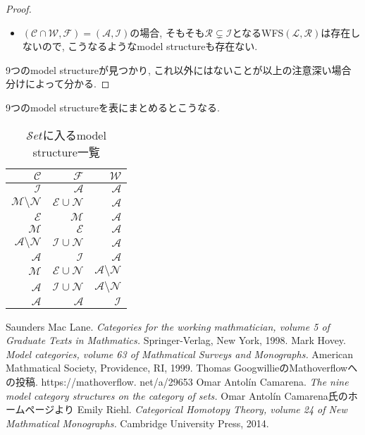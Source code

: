 \documentclass[. /main]{subfiles}
\begin{document}
\begin{proof}
\begin{itemize}
\item $(\mathcal{C} \cap \mathcal{W},  \mathcal{F})=(\mathcal{A},  \mathcal{I})$の場合, そもそも$\mathcal{R} \subsetneq \mathcal{I}$となるWFS$(\mathcal{L},  \mathcal{R})$は存在しないので, こうなるようなmodel structureも存在ない. 
\end{itemize}
9つのmodel structureが見つかり, これ以外にはないことが以上の注意深い場合分けによって分かる. 
\end{proof}
9つのmodel structureを表にまとめるとこうなる. 
\begin{table}[hbtp]
\caption{$\mathcal{S}et$に入るmodel structure一覧}
\centering
\begin{tabular}{rrr}
\hline
$\mathcal{C}$& $\mathcal{F}$& $\mathcal{W}$\\
\hline \hline
$\mathcal{I}$& $\mathcal{A}$& $\mathcal{A}$\\
$\mathcal{M} \setminus \mathcal{N}$& $\mathcal{E} \cup \mathcal{N}$& $\mathcal{A}$\\
$\mathcal{E}$& $\mathcal{M}$& $\mathcal{A}$\\
$\mathcal{M}$& $\mathcal{E}$& $\mathcal{A}$\\
$\mathcal{A} \setminus \mathcal{N}$& $\mathcal{I} \cup \mathcal{N}$& $\mathcal{A}$\\
$\mathcal{A}$& $\mathcal{I}$& $\mathcal{A}$\\
$\mathcal{M}$& $\mathcal{E} \cup \mathcal{N}$& $\mathcal{A} \setminus \mathcal{N}$\\
$\mathcal{A}$& $\mathcal{I} \cup \mathcal{N}$& $\mathcal{A} \setminus \mathcal{N}$\\
$\mathcal{A}$& $\mathcal{A}$& $\mathcal{I}$\\
\hline
\end{tabular}
\end{table}

\begin{thebibliography}{9}
 Saunders Mac Lane.  
{\it Categories for the working mathmatician,  volume 5 of Graduate Texts in Mathmatics.}  Springer-Verlag,  New York,  1998. 
 Mark Hovey. 
{\it Model categories,  volume 63 of Mathmatical Surveys and Monographs.}  American Mathmatical Society,  Providence,  RI,  1999. 
 Thomas GoogwillieのMathoverflowへの投稿.  
https://mathoverflow. net/a/29653
 Omar Antolín Camarena. 
{\it The nine model category structures on the category of sets. } Omar Antolín Camarena氏のホームページより
 Emily Riehl. 
{\it Categorical Homotopy Theory,  volume 24 of New Mathmatical Monographs.}  Cambridge University Press,  2014. 

\end{thebibliography}
\end{document}
